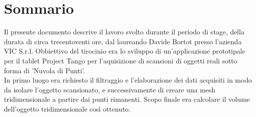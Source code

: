 
\cleardoublepage
{}
{}
\begingroup
\let\clearpage\relax
\let\cleardoublepage\relax
\let\cleardoublepage\relax

\chapter*{Sommario}

Il presente documento descrive il lavoro svolto durante il periodo di stage, della durata di circa trecentoventi ore, dal laureando Davide Bortot presso l'azienda VIC S.r.l.
Obbiettivo del tirocinio era lo sviluppo di un'applicazione prototipale per il tablet Project Tango per l'aquisizione di scansioni di oggetti reali sotto forma di 'Nuvola di Punti'. \\
In primo luogo era richiesto il filtraggio e l'elaborazione dei dati acquisiti in modo da isolare l'oggetto scansionato, e successivamente di creare una mesh tridimensionale a partire dai punti rimanenti. Scopo finale era calcolare il volume dell'oggetto tridimensionale così ottenuto.

%
%

\endgroup			

\vfill

